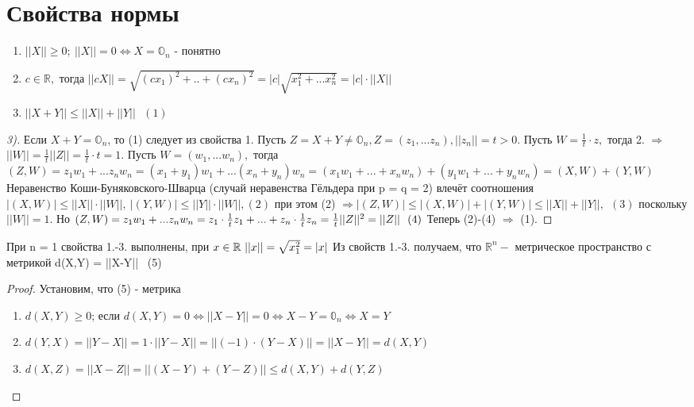 \section{Свойства нормы}
\begin{property}
	\begin{enumerate}
		\item $||X|| \geq 0; \ ||X|| = 0 \Leftrightarrow X = \mathbb{O}_n$ - понятно
		\item $c \in \mathbb{R},$ тогда $||cX|| = \sqrt{(cx_1)^2+..+(cx_n)^2} = |c|\sqrt{x_1^2+...x_n^2} = |c|\cdot||X||$
		\item $||X+Y|| \leq ||X|| + ||Y|| \ \ \ (1)$
	\end{enumerate}
\end{property}
\begin{proof}[3)]
	Если $X +Y = \mathbb{O}_n$, то (1) следует из свойства 1. Пусть $Z = X + Y \neq \mathbb{O}_n, Z = (z_1,...z_n), ||z_n|| = t > 0$. Пусть $W = \frac{1}{t}\cdot z,$ тогда  2. $\Rightarrow$ $||W|| = \frac{1}{t}||Z|| = \frac{1}{t}\cdot t = 1$. Пусть $W = (w_1,...w_n),$ тогда $(Z,W) = z_1w_1+...z_nw_n = (x_1+y_1)w_1 + ...(x_n+y_n)w_n = (x_1w_1+...+x_nw_n) + (y_1w_1+...+y_nw_n) = (X,W)+ (Y,W)$ Неравенство Коши-Буняковского-Шварца (случай неравенства Гёльдера при p = q = 2) влечёт соотношения $|(X,W)| \leq ||X||\cdot||W||, \ |(Y,W)|\leq ||Y||\cdot ||W||, (2)$ при этом (2) $\Rightarrow |(Z,W)| \leq |(X,W)| + |(Y,W)| \leq ||X|| + ||Y||,  \ \ (3)$ поскольку $||W|| = 1$. Но $(Z,W) = z_1w_1+...z_nw_n = z_1\cdot\frac{1}{t}z_1 + ...+z_n\cdot \frac{1}{t}z_n = \frac{1}{t}||Z||^2 = ||Z|| \ \ (4) \\$
	Теперь (2)-(4) $\Rightarrow$ (1).  
 \end{proof}
 При n = 1 свойства 1.-3. выполнены, при $x \in \mathbb{R} \ ||x|| = \sqrt{x_1^2}= |x|\ \\ $
 Из свойств 1.-3. получаем, что $\mathbb{R}^n-$ метрическое пространство с метрикой d(X,Y) = ||X-Y|| \ (5) \\
 \begin{proof}
 Установим, что (5) - метрика
 \begin{enumerate}
 	\item $d(X,Y) \geq 0$; если $d(X,Y) = 0 \Leftrightarrow ||X-Y|| = 0 \Leftrightarrow X - Y = \mathbb{0}_n \Leftrightarrow X = Y$
 	\item $d(Y,X) = ||Y-X|| = 1\cdot ||Y-X|| = ||(-1)\cdot (Y-X)|| = ||X-Y|| = d(X,Y)$
 	\item $d(X,Z) = ||X-Z|| = ||(X-Y) + (Y-Z)|| \leq d(X,Y) + d(Y,Z)$
 \end{enumerate}
\end{proof}
